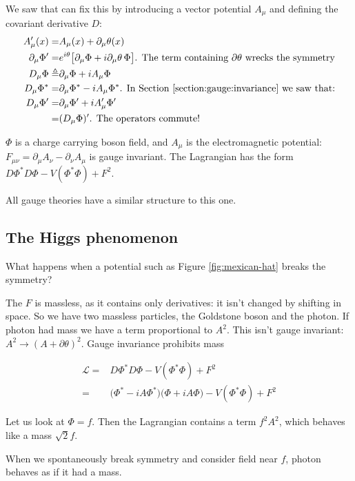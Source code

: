 \documentclass[]{article}
\begin{document}
We saw that can fix this by introducing a vector potential $A_\mu$ and defining the covariant derivative $D$:
\begin{align*}
	A^\prime_\mu(x) =& A_\mu(x) + \partial_\mu \theta(x)\\
	\partial_\mu \Phi^\prime =& e^{i\theta} \big[\partial_\mu \Phi + i \partial_\mu \theta \,\Phi\big] \text{. The term containing $\partial \theta$  wrecks the symmetry}\\
	D_\mu \Phi \triangleq& \partial_\mu \Phi + i A_\mu \Phi\\
	D_\mu \Phi^* =& \partial_\mu \Phi^* - i A_\mu \Phi^* \text{. In Section \ref{section:gauge:invariance} we saw that:}\\
	D_\mu \Phi^\prime =& \partial_\mu \Phi^\prime + i A^\prime_\mu \Phi^\prime \\
	=& (D_\mu \Phi)^\prime \text{. The operators commute!}
\end{align*}

$\Phi$ is a charge carrying boson field, and $A_\mu$ is the electromagnetic potential: $F_{\mu\nu}=\partial_\mu A_\nu-\partial_\nu A_\mu$ is gauge invariant. The Lagrangian has the form $D\Phi^* D\Phi -V(\Phi^*\Phi) +F^2$. 

All gauge theories have a similar structure to this one.

\subsection{The Higgs phenomenon}

What happens when a potential such as Figure \ref{fig:mexican-hat} breaks the symmetry?

The $F$ is massless, as it contains only derivatives: it isn't changed by shifting in space. So we have two massless particles, the Goldstone boson and the photon. If photon had mass we have a term proportional to $A^2$. This isn't gauge invariant: $A^2 \rightarrow (A+\partial \theta)^2$. Gauge invariance prohibits mass

\begin{align*}
	\mathcal{L} =& D\Phi^* D\Phi -V(\Phi^*\Phi) +F^2\\
	=& \big( \Phi^* - i A \Phi^*\big) \big( \Phi + i A \Phi\big) -V(\Phi^*\Phi) +F^2
\end{align*}

Let us look at $\Phi = f$. Then the Lagrangian contains a term $f^2A^2$, which behaves like a mass $\sqrt{2}f$.

When we spontaneously break symmetry and consider field near $f$, photon behaves as if it had a mass.
\end{document}
